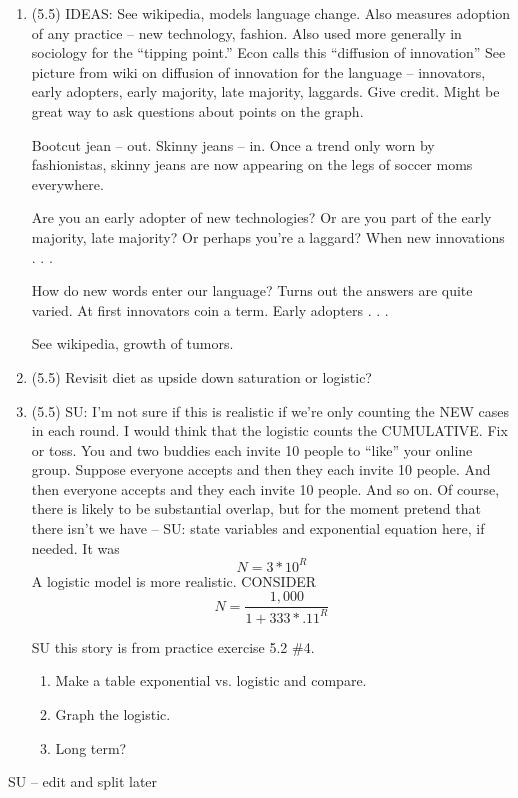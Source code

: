 \documentclass[12pt]{article}
\begin{document}
\begin{enumerate}
\item (5.5) IDEAS:  See wikipedia, models language change.  Also measures adoption of any practice -- new technology, fashion.  Also used more generally in sociology for the ``tipping point.''  Econ calls this ``diffusion of innovation''  See picture from wiki on diffusion of innovation for the language -- innovators, early adopters, early majority, late majority, laggards.  Give credit.  Might be great way to ask questions about points on the graph.

 Bootcut jean -- out.  Skinny jeans -- in.  Once a trend only worn by fashionistas, skinny jeans are now appearing on the legs of soccer moms everywhere.  

Are you an early adopter of new technologies?  Or are you part of the early majority, late majority?  Or perhaps you're a laggard?  When new innovations . . .

How do new words enter our language?  Turns out the answers are quite varied.  At first innovators coin a term.  Early adopters . . .

See wikipedia, growth of tumors.


\item (5.5)  Revisit diet as upside down saturation or logistic?

\item (5.5) SU:  I'm not sure if this is realistic if we're only counting the NEW cases in each round.  I would think that the logistic counts the CUMULATIVE.  Fix or toss. You and two buddies each invite 10 people to ``like'' your online group.  Suppose everyone accepts and then they each invite 10 people.  And then everyone accepts and they each invite 10 people.  And so on. Of course, there is likely to be substantial overlap, but for the moment pretend that there isn't we have -- SU:  state variables and exponential equation here, if needed.  It was $$N=3 \ast 10^R$$
A logistic model is more realistic.  CONSIDER $$ N = \frac{1,000}{1+333 \ast .11^R}$$

SU this story is from practice exercise 5.2 \#4.
\begin{enumerate}
\item Make a table exponential vs. logistic and compare.
\item Graph the logistic.
\item Long term?
\end{enumerate} 

\end{enumerate}

SU -- edit and split later
\end{document}
